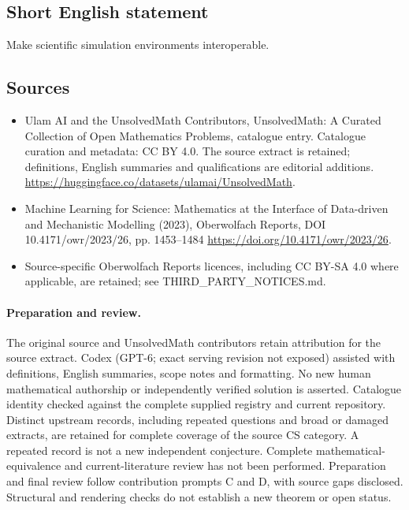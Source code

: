 \documentclass[11pt]{article}
\begin{document}
\subsection{Short English statement}
Make scientific simulation environments interoperable.
\subsection{Sources}
\begin{itemize}
\item[\hypertarget{source:statement:1}{S1}] Ulam AI and the UnsolvedMath Contributors, UnsolvedMath: A Curated Collection of Open Mathematics Problems, catalogue entry. Catalogue curation and metadata: CC BY 4.0. The source extract is retained; definitions, English summaries and qualifications are editorial additions.
\url{https://huggingface.co/datasets/ulamai/UnsolvedMath}.
\item[\hypertarget{source:statement:2}{S2}] Machine Learning for Science: Mathematics at the Interface of Data-driven and Mechanistic Modelling (2023), Oberwolfach Reports, DOI 10.4171/owr/2023/26, pp. 1453--1484
\url{https://doi.org/10.4171/owr/2023/26}.
\item Source-specific Oberwolfach Reports licences, including CC BY-SA 4.0 where applicable, are retained; see THIRD\_PARTY\_NOTICES.md.
\end{itemize}
\paragraph{Preparation and review.}
The original source and UnsolvedMath contributors retain attribution for the source extract. Codex (GPT-6; exact serving revision not exposed) assisted with definitions, English summaries, scope notes and formatting. No new human mathematical authorship or independently verified solution is asserted. Catalogue identity checked against the complete supplied registry and current repository. Distinct upstream records, including repeated questions and broad or damaged extracts, are retained for complete coverage of the source CS category. A repeated record is not a new independent conjecture. Complete mathematical-equivalence and current-literature review has not been performed. Preparation and final review follow contribution prompts C and D, with source gaps disclosed. Structural and rendering checks do not establish a new theorem or open status.
\label{end:statement}
\end{document}

